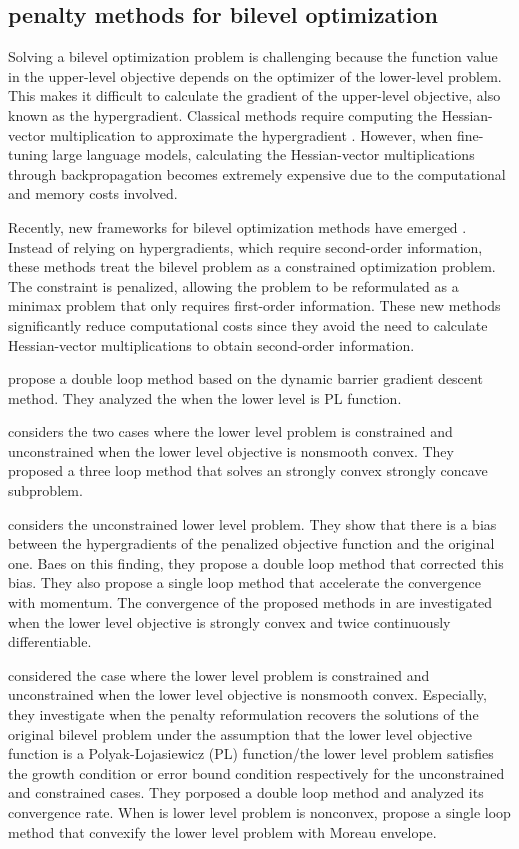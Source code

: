 \subsection{penalty methods for bilevel optimization}
Solving a bilevel optimization problem is challenging because the function value in the upper-level objective depends on the optimizer of the lower-level problem. This makes it difficult to calculate the gradient of the upper-level objective, also known as the hypergradient. Classical methods require computing the Hessian-vector multiplication to approximate the hypergradient \cite{FrDoFrPo17,FrFrSaGrPo18,FiAbLe17,LiGuHu21,RaFiKaLe19,GhWa18,ChKaZh22,LiXiFeZhYoPiUZ18}. However, when fine-tuning large language models, calculating the Hessian-vector multiplications through backpropagation becomes extremely expensive due to the computational and memory costs involved.

Recently, new frameworks for bilevel optimization methods have emerged \cite{LuMei24, ShenC23, LiuLYZZ24, KwonKWN23}. Instead of relying on hypergradients, which require second-order information, these methods treat the bilevel problem as a constrained optimization problem. The constraint is penalized, allowing the problem to be reformulated as a minimax problem that only requires first-order information. These new methods significantly reduce computational costs since they avoid the need to calculate Hessian-vector multiplications to obtain second-order information.

\cite{LiuYWSL22} propose a double loop method based on the dynamic barrier gradient descent method. They  analyzed the when the lower level is PL function.


 \cite{LuMei24} considers the two cases where the lower level problem is constrained and unconstrained when the lower level objective is nonsmooth convex.  They proposed a three loop method that solves an strongly convex strongly concave subproblem.


 \cite{KwonKWN23} considers the unconstrained lower level problem. They show that there is a bias between the hypergradients of the penalized objective function and the original one. Baes on this finding, they propose a double loop method that corrected this bias. They also propose a single loop method that accelerate the convergence with momentum. The convergence of the proposed methods in \cite{KwonKWN23}  are investigated when the lower level objective is strongly convex and twice continuously differentiable.

 \cite{ShenC23} considered the case where the lower level problem is constrained and unconstrained when the lower level objective is nonsmooth convex. Especially,  they investigate when the penalty reformulation recovers the solutions of the original bilevel problem under the assumption that the lower level objective function is a Polyak-Lojasiewicz (PL) function/the lower level problem satisfies the growth condition or error bound condition respectively for the unconstrained and constrained cases. They porposed a double loop method and analyzed its convergence rate. When is lower level problem is nonconvex, \cite{LiuLYZZ24} propose a single loop method that convexify the lower level problem with Moreau envelope.

